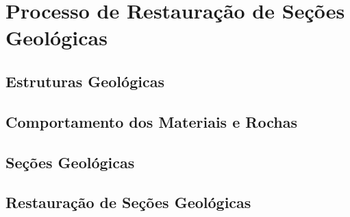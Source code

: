 
\chapter{Processo de Restauração de Seções Geológicas}

\section{Estruturas Geológicas}

\section{Comportamento dos Materiais e Rochas}

\section{Seções Geológicas}

\section{Restauração de Seções Geológicas}

